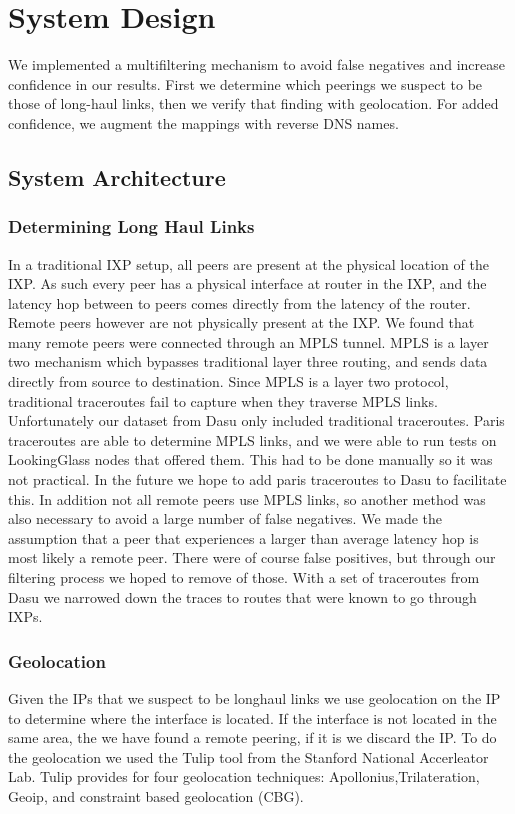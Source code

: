 \documentclass{acm_proc_article-sp}
\begin{document}
\section{System Design}
We implemented a multifiltering mechanism to avoid false negatives and increase confidence in our results.
First we determine which peerings we suspect to be those of long-haul links, 
then we verify that finding with geolocation. For added confidence,
we augment the mappings with reverse DNS names. 

\subsection{System Architecture}
\subsubsection{Determining Long Haul Links}
In a traditional IXP setup, all peers are present at the physical location of the IXP. 
As such every peer has a physical interface at router in the IXP, and the latency hop between
to peers comes directly from the latency of the router. Remote peers however are not physically 
present at the IXP. We found that many remote peers were connected through an MPLS tunnel.
MPLS is a layer two mechanism which bypasses traditional layer three routing, and sends data directly
from source to destination. Since MPLS is a layer two protocol, traditional traceroutes fail to capture when 
they traverse MPLS links. Unfortunately our dataset from Dasu only included traditional traceroutes. Paris traceroutes
are able to determine MPLS links, and we were able to run tests on LookingGlass nodes that offered them. This had to be done
manually so it was not practical. In the future we hope to add paris traceroutes to Dasu to facilitate this. 
In addition not all remote peers use MPLS links, so another method was also necessary to avoid a large number of
false negatives.  
We made the assumption that a peer that experiences a larger than average
latency hop is most likely a remote peer. There were of course false positives, but 
through our filtering process we hoped to remove of those. With a set of traceroutes from
Dasu \cite{Sanchez:2011} we narrowed down the traces to routes that were known to go through IXPs.
\subsubsection{Geolocation}
Given the IPs that we suspect to be longhaul links we use geolocation on the IP to determine where
the interface is located. If the interface is not located in the same area, the we have found a 
remote peering, if it is we discard the IP. To do the geolocation we used the Tulip tool from the Stanford
National Accerleator Lab. 
Tulip provides for four geolocation techniques: Apollonius,Trilateration, Geoip, and constraint based geolocation (CBG).
\end{document}
